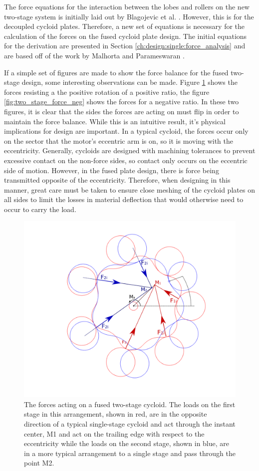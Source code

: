 The force equations for the interaction between the lobes and rollers on the new two-stage system is initially laid out by Blagojevic et al. \cite{ref:new_two_stage}. However, this is for the decoupled cycloid plates. Therefore, a new set of equations is necessary for the calculation of the forces on the fused cycloid plate design. The initial equations for the derivation are presented in Section \ref{ch:design:single:force_analysis} and are based off of the work by Malhorta and Parameswaran \cite{ref:malhorta_2}. 

If a simple set of figures are made to show the force balance for the fused two-stage design, some interesting observations can be made. Figure \ref{fig:two_stage_force_pos} shows the forces resisting a the positive rotation of a positive ratio, the figure \ref{fig:two_stage_force_neg} shows the forces for a negative ratio. In these two figures, it is clear that the sides the forces are acting on must flip in order to maintain the force balance. While this is an intuitive result, it's physical implications for design are important. In a typical cycloid, the forces occur only on the sector that the motor's eccentric arm is on, so it is moving with the eccentricity. Generally, cycloids are designed with machining tolerances to prevent excessive contact on the non-force sides, so contact only occurs on the eccentric side of motion. However, in the fused plate design, there is force being transmitted opposite of the eccentricity. Therefore, when designing in this manner, great care must be taken to ensure close meshing of the cycloid plates on all sides to limit the losses in material deflection that would otherwise need to occur to carry the load. 


\begin{figure}[h]
	\centering
	\includegraphics[width=0.80\linewidth]{fig/two_stage_loads_pos}
   \caption{The forces acting on a fused two-stage cycloid. The loads on the first stage in this arrangement, shown in red, are in the opposite direction of a typical single-stage cycloid and act through the instant center, M1 and act on the trailing edge with respect to the eccentricity while the loads on the second stage, shown in blue, are in a more typical arrangement to a single stage and pass through the point M2. }
   \label{fig:two_stage_force_pos}
\end{figure}

